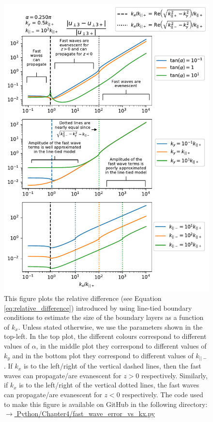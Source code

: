 \begin{figure}
    \centering
    \vspace{-20pt}
    \includegraphics[width=\textwidth,height=0.8\textheight,keepaspectratio]{figures/chapter04/fast_wave_error_vs_kx.pdf}
    \vspace{-10pt}
    \caption{This figure plots the relative difference (see Equation \ref{eq:relative_difference}) introduced by using line-tied boundary conditions to estimate the size of the boundary layers as a function of $k_x$. Unless stated otherwise, we use the parameters shown in the top-left. In the top plot, the different colours correspond to different values of $\alpha$, in the middle plot they correspond to different values of $k_y$ and in the bottom plot they correspond to different values of $k_{||-}$. If $k_x$ is to the left/right of the vertical dashed lines, then the fast waves can propagate/are evanescent for $z>0$ respectively. Similarly, if $k_x$ is to the left/right of the vertical dotted lines, the fast waves can propagate/are evanescent for $z<0$ respectively. The code used to make this figure is available on GitHub in the following directory:\newline
    \href{https://github.com/aleksyprok/apkp_thesis/blob/main/Python/Chapter4/fast_wave_error_vs_kx.py}{$\rightarrow$ Python/Chapter4/fast\_wave\_error\_vs\_kx.py}}
    \label{fig:fast_wave_error_vs_kx}
    \vspace{-20pt}
\end{figure}

